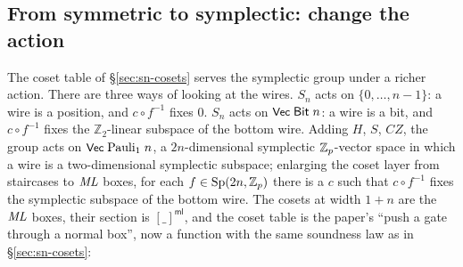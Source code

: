 \subsection{From symmetric to symplectic: change the action}\label{sec:pushing}

The coset table of \S\ref{sec:sn-cosets} serves the symplectic group under a
richer action.  There are three ways of looking at the wires.  $S_n$
acts on $\{0,\dots,n-1\}$: a wire is a position, and $c \circ f^{-1}$
fixes $0$.  $S_n$ acts on $\mbox{\textsf{\small Vec}}\;\mathsf{Bit}\;n$: a wire is a
bit, and $c \circ f^{-1}$ fixes the $\mathbb{Z}_2$-linear subspace of
the bottom wire.  Adding $H$, $S$, $CZ$, the group acts on
$\mbox{\textsf{\small Vec}}\;\mathrm{Pauli}_1\;n$, a $2n$-dimensional symplectic
$\mathbb{Z}_p$-vector space in which a wire is a two-dimensional symplectic
subspace; enlarging the coset layer from staircases to $\mathit{ML}$ boxes, for
each $f \in \mathrm{Sp}(2n,\mathbb{Z}_p)$ there is a $c$ such that $c \circ f^{-1}$ fixes the
symplectic subspace of the bottom wire.  The cosets at width $1{+}n$
are the $\mathit{ML}$ boxes, their section is $[\_]^{\mathsf{ml}}$, and the coset
table is the paper's ``push a gate through a normal box'', now a
function with the same soundness law as in \S\ref{sec:sn-cosets}:

